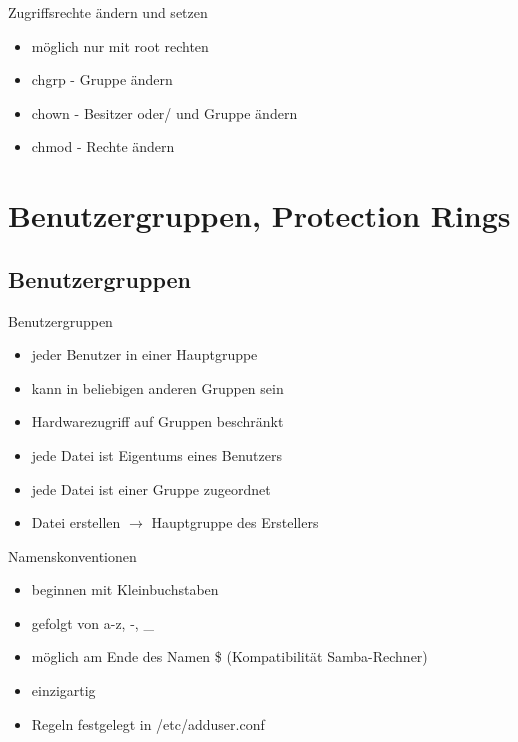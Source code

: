 \documentclass[ucs,9pt]{beamer}
\begin{document}
\begin{frame}{Zugriffsrechte ändern und setzen}
\begin{itemize}
	\item möglich nur mit root rechten
	\item chgrp - Gruppe ändern 
	\item chown - Besitzer oder/ und Gruppe ändern
	\item chmod - Rechte ändern
\end{itemize}
\end{frame}

\section{Benutzergruppen, Protection Rings}

\subsection{Benutzergruppen}

\begin{frame}{Benutzergruppen}
\begin{itemize}
\item jeder Benutzer in einer Hauptgruppe
\item kann in beliebigen anderen Gruppen sein
\item Hardwarezugriff auf Gruppen beschränkt
\item jede Datei ist Eigentums eines Benutzers
\item jede Datei ist einer Gruppe zugeordnet
\item Datei erstellen $\rightarrow$ Hauptgruppe des Erstellers
\end{itemize}
\end{frame}

\begin{frame}{Namenskonventionen}
\begin{itemize}
\item beginnen mit Kleinbuchstaben
\item gefolgt von a-z, -, \_
\item möglich am Ende des Namen \$ (Kompatibilität Samba-Rechner)
\item einzigartig
\end{itemize}
\begin{itemize}
\item Regeln festgelegt in /etc/adduser.conf
\end{itemize}
\end{frame}
\end{document}

